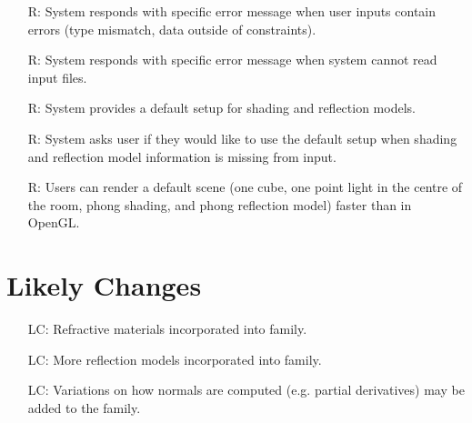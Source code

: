 \documentclass[12pt]{article}
\newcounter{reqnum} %
\newcounter{lcnum} %
\begin{document}
\noindent \begin{itemize}	
	\item[R\refstepcounter{reqnum}\thereqnum \label{NFR_Errors}:]System 
	responds with specific error message when user inputs contain errors (type 
	mismatch, data outside of constraints).
	\item[R\refstepcounter{reqnum}\thereqnum \label{NFR_Errors2}:]System 
	responds with specific error message when system cannot read input files.
	\item[R\refstepcounter{reqnum}\thereqnum \label{NFR_Default}:]System 
	provides a default setup for shading and reflection models.
	\item[R\refstepcounter{reqnum}\thereqnum \label{NFR_Default2}:]	System asks 
	user if they would like to use the default setup when shading and 
	reflection model information is missing from input.
	\item[R\refstepcounter{reqnum}\thereqnum \label{NFR_Usability}:]Users can 
	render a default scene (one cube, one point light in the centre of the 
	room, phong shading, and phong reflection model) faster than in OpenGL.
\end{itemize}


\section{Likely Changes}    

\noindent \begin{itemize}

\item[LC\refstepcounter{lcnum}\thelcnum\label{LC_refraction}:] Refractive 
materials incorporated into family.
\item[LC\refstepcounter{lcnum}\thelcnum\label{LC_reflection_models}:] More 
reflection models incorporated into family.
\item[LC\refstepcounter{lcnum}\thelcnum\label{LC_normals}:] Variations on how 
normals are computed (e.g. partial derivatives) may be added to the family.

\end{itemize}
\end{document}
